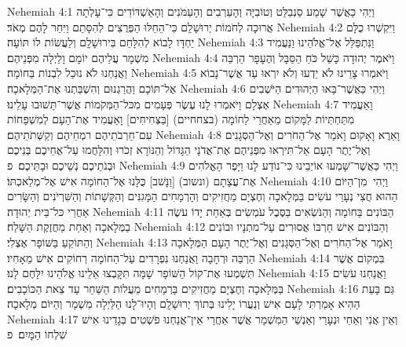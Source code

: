 Nehemiah 4:1	וַיְהִי כַאֲשֶׁר שָׁמַע סַנְבַלַּט וְטוֹבִיָּה וְהָעַרְבִים וְהָעַמֹּנִים וְהָאַשְׁדּוֹדִים כִּי־עָלְתָה אֲרוּכָה לְחֹמוֹת יְרוּשָׁלַ͏ִם כִּי־הֵחֵלּוּ הַפְּרֻצִים לְהִסָּתֵם וַיִּחַר לָהֶם מְאֹד׃
Nehemiah 4:2	וַיִּקְשְׁרוּ כֻלָּם יַחְדָּו לָבוֹא לְהִלָּחֵם בִּירוּשָׁלָ͏ִם וְלַעֲשׂוֹת לוֹ תּוֹעָה׃
Nehemiah 4:3	וַנִּתְפַּלֵּל אֶל־אֱלֹהֵינוּ וַנַּעֲמִיד מִשְׁמָר עֲלֵיהֶם יוֹמָם וָלַיְלָה מִפְּנֵיהֶם׃
Nehemiah 4:4	וַיֹּאמֶר יְהוּדָה כָּשַׁל כֹּחַ הַסַּבָּל וְהֶעָפָר הַרְבֵּה וַאֲנַחְנוּ לֹא נוּכַל לִבְנוֹת בַּחוֹמָה׃
Nehemiah 4:5	וַיֹּאמְרוּ צָרֵינוּ לֹא יֵדְעוּ וְלֹא יִרְאוּ עַד אֲשֶׁר־נָבוֹא אֶל־תּוֹכָם וַהֲרַגְנוּם וְהִשְׁבַּתְנוּ אֶת־הַמְּלָאכָה׃
Nehemiah 4:6	וַיְהִי כַּאֲשֶׁר־בָּאוּ הַיְּהוּדִים הַיֹּשְׁבִים אֶצְלָם וַיֹּאמְרוּ לָנוּ עֶשֶׂר פְּעָמִים מִכּל־הַמְּקֹמוֹת אֲשֶׁר־תָּשׁוּבוּ עָלֵינוּ׃
Nehemiah 4:7	וָאַעֲמִיד מִתַּחְתְּיוֹת לַמָּקוֹם מֵאַחֲרֵי לַחוֹמָה (בצחחיים) [בַּצְּחִיחִים] וָאַעֲמִיד אֶת־הָעָם לְמִשְׁפָּחוֹת עִם־חַרְבֹתֵיהֶם רמְחֵיהֶם וְקַשְּׁתֹתֵיהֶם׃
Nehemiah 4:8	וָאֵרֶא וָאָקוּם וָאֹמַר אֶל־הַחֹרִים וְאֶל־הַסְּגָנִים וְאֶל־יֶתֶר הָעָם אַל־תִּירְאוּ מִפְּנֵיהֶם אֶת־אֲדֹנָי הַגָּדוֹל וְהַנּוֹרָא זְכֹרוּ וְהִלָּחֲמוּ עַל־אֲחֵיכֶם בְּנֵיכֶם וּבְנֹתֵיכֶם נְשֵׁיכֶם וּבָתֵּיכֶם׃ {פ}
Nehemiah 4:9	וַיְהִי כַּאֲשֶׁר־שָׁמְעוּ אוֹיְבֵינוּ כִּי־נוֹדַע לָנוּ וַיָּפֶר הָאֱלֹהִים אֶת־עֲצָתָם (ונשוב) [וַנָּשׁב] כֻּלָּנוּ אֶל־הַחוֹמָה אִישׁ אֶל־מְלַאכְתּוֹ׃
Nehemiah 4:10	וַיְהִי  מִן־הַיּוֹם הַהוּא חֲצִי נְעָרַי עֹשִׂים בַּמְּלָאכָה וְחֶצְיָם מַחֲזִיקִים וְהָרְמָחִים הַמָּגִנִּים וְהַקְּשָׁתוֹת וְהַשִּׁרְיֹנִים וְהַשָּׂרִים אַחֲרֵי כּל־בֵּית יְהוּדָה׃
Nehemiah 4:11	הַבּוֹנִים בַּחוֹמָה וְהַנֹּשְׂאִים בַּסֶּבֶל עֹמְשִׂים בְּאַחַת יָדוֹ עֹשֶׂה בַמְּלָאכָה וְאַחַת מַחֲזֶקֶת הַשָּׁלַח׃
Nehemiah 4:12	וְהַבּוֹנִים אִישׁ חַרְבּוֹ אֲסוּרִים עַל־מתְנָיו וּבוֹנִים וְהַתּוֹקֵעַ בַּשּׁוֹפָר אֶצְלִי׃
Nehemiah 4:13	וָאֹמַר אֶל־הַחֹרִים וְאֶל־הַסְּגָנִים וְאֶל־יֶתֶר הָעָם הַמְּלָאכָה הַרְבֵּה וּרְחָבָה וַאֲנַחְנוּ נִפְרָדִים עַל־הַחוֹמָה רְחוֹקִים אִישׁ מֵאָחִיו׃
Nehemiah 4:14	בִּמְקוֹם אֲשֶׁר תִּשְׁמְעוּ אֶת־קוֹל הַשּׁוֹפָר שָׁמָּה תִּקָּבְצוּ אֵלֵינוּ אֱלֹהֵינוּ יִלָּחֶם לָנוּ׃
Nehemiah 4:15	וַאֲנַחְנוּ עֹשִׂים בַּמְּלָאכָה וְחֶצְיָם מַחֲזִיקִים בָּרְמָחִים מֵעֲלוֹת הַשַּׁחַר עַד צֵאת הַכּוֹכָבִים׃
Nehemiah 4:16	גַּם בָּעֵת הַהִיא אָמַרְתִּי לָעָם אִישׁ וְנַעֲרוֹ יָלִינוּ בְּתוֹךְ יְרוּשָׁלָ͏ִם וְהָיוּ־לָנוּ הַלַּיְלָה מִשְׁמָר וְהַיּוֹם מְלָאכָה׃
Nehemiah 4:17	וְאֵין אֲנִי וְאַחַי וּנְעָרַי וְאַנְשֵׁי הַמִּשְׁמָר אֲשֶׁר אַחֲרַי אֵין־אֲנַחְנוּ פֹשְׁטִים בְּגָדֵינוּ אִישׁ שִׁלְחוֹ הַמָּיִם׃ {פ}
